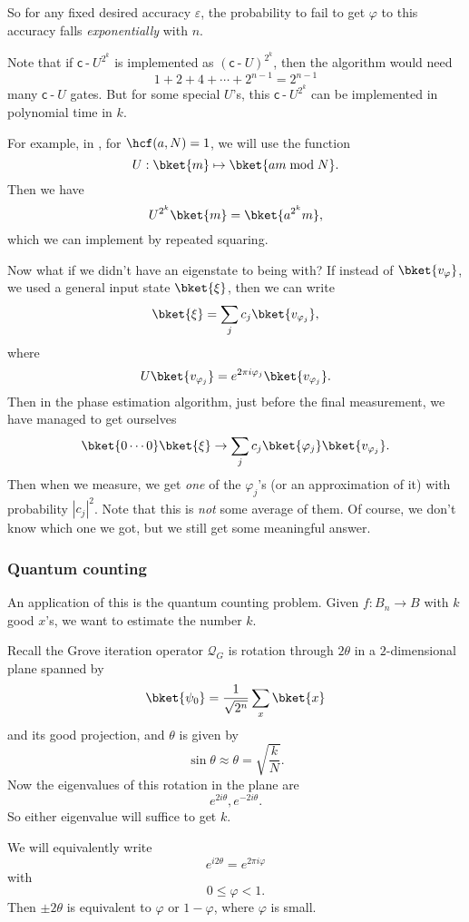 \documentclass[a4paper]{article}
\newcommand{\qcd}{\mathsf{c}\operatorname{-}}
\begin{document}
So for any fixed desired accuracy $\varepsilon$, the probability to fail to get $\varphi$ to this accuracy falls \emph{exponentially} with $n$.

Note that if $\qcd U^{2^k}$ is implemented as $(\qcd U)^{2^k}$, then the algorithm would need
\[
  1 + 2 + 4 + \cdots + 2^{n - 1} = 2^{n - 1}
\]
many $\qcd U$ gates. But for some special $U$'s, this $\qcd U^{2^k}$ can be implemented in polynomial time in $k$.

For example, in , for $\hcf(a, N) = 1$, we will use the function
\[
  U: \bket{m} \mapsto \bket{am \bmod N}.
\]
Then we have
\[
  U^{2^k}\bket{m} = \bket{a^{2^k}m},
\]
which we can implement by repeated squaring.

Now what if we didn't have an eigenstate to being with? If instead of $\bket{v_\varphi}$, we used a general input state $\bket{\xi}$, then we can write
\[
  \bket{\xi} = \sum_j c_j \bket{v_{\varphi_j}},
\]
where
\[
  U \bket{v_{\varphi_j}} = e^{2\pi i \varphi_j}\bket{v_{\varphi_j}}.
\]
Then in the phase estimation algorithm, just before the final measurement, we have managed to get ourselves
\[
  \bket{0\cdots0}\bket{\xi} \to \sum_j c_j \bket{\varphi_j} \bket{v_{\varphi_j}}.
\]
Then when we measure, we get \emph{one} of the $\varphi_j$'s (or an approximation of it) with probability $|c_j|^2$. Note that this is \emph{not} some average of them. Of course, we don't know which one we got, but we still get some meaningful answer.

\subsubsection*{Quantum counting}
An application of this is the quantum counting problem. Given $f: B_n \to B$ with $k$ good $x$'s, we want to estimate the number $k$.

Recall the Grove iteration operator $\mathcal{Q}_G$ is rotation through $2\theta$ in a $2$-dimensional plane spanned by
\[
  \bket{\psi_0} = \frac{1}{\sqrt{2^n}} \sum_x \bket{x}
\]
and its good projection, and $\theta$ is given by
\[
  \sin \theta \approx \theta = \sqrt{\frac{k}{N}}.
\]
Now the eigenvalues of this rotation in the plane are
\[
  e^{2i \theta}, e^{-2i\theta}.
\]
So either eigenvalue will suffice to get $k$.

We will equivalently write
\[
  e^{i2\theta} = e^{2\pi i \varphi}
\]
with
\[
  0 \leq \varphi < 1.
\]
Then $\pm 2 \theta$ is equivalent to $\varphi$ or $1 - \varphi$, where $\varphi$ is small.
\end{document}
